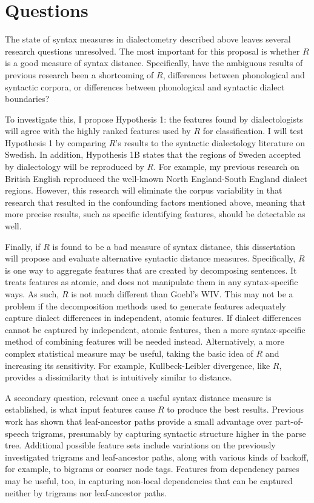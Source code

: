 \chapter{Questions}
The state of syntax measures in dialectometry described above leaves
several research questions unresolved. The most important for this
proposal is whether $R$ is a good measure of syntax
distance. Specifically, have the ambiguous results of previous
research been a shortcoming of $R$, differences between phonological
and syntactic corpora, or differences between phonological and
syntactic dialect boundaries?

To investigate this, I propose Hypothesis 1: the features found by
dialectologists will agree with the highly ranked features used by $R$
for classification. I will test Hypothesis 1 by comparing $R$'s
results to the syntactic dialectology literature on Swedish. In
addition, Hypothesis 1B states that the regions of Sweden accepted by
dialectology will be reproduced by $R$. For example, my
previous research on British English reproduced the well-known North
England-South England dialect regions. However, this research will eliminate the
corpus variability in that research \cite{sanders08b} that resulted in
the confounding factors mentioned above, meaning that more precise
results, such as specific identifying features, should be detectable as well.

Finally, if $R$ is found to be a bad measure of syntax distance, this
dissertation will propose and evaluate alternative syntactic distance
measures. Specifically, $R$ is one way to aggregate features that are
created by decomposing sentences. It treats features as atomic, and
does not manipulate them in any syntax-specific ways. As such, $R$ is
not much different than Goebl's WIV. This may not be a problem if the
decomposition methods used to generate features adequately capture
dialect differences in independent, atomic features. If dialect
differences cannot be captured by independent, atomic features, then a
more syntax-specific method of combining features will be needed
instead. Alternatively, a more complex statistical measure may be
useful, taking the basic idea of $R$ and increasing its
sensitivity. For example, Kullbeck-Leibler divergence, like $R$,
provides a dissimilarity that is intuitively similar to distance.

A secondary question, relevant once a useful syntax distance measure
is established, is what input features cause $R$ to produce the best
results.  Previous work has shown that leaf-ancestor paths provide a
small advantage over part-of-speech trigrams, presumably by capturing
syntactic structure higher in the parse tree. Additional possible
feature sets include variations on the previously investigated
trigrams and leaf-ancestor paths, along with various kinds of backoff,
for example, to bigrams or coarser node tags. Features from dependency
parses may be useful, too, in capturing non-local dependencies that
can be captured neither by trigrams nor leaf-ancestor paths.

